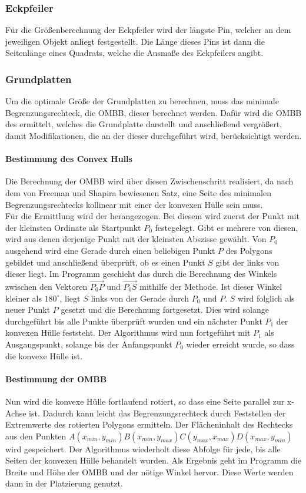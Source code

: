 \subsubsection{Eckpfeiler}
Für die Größenberechnung der Eckpfeiler wird der längste Pin, welcher an dem jeweiligen Objekt anliegt festgestellt.
Die Länge dieses Pins ist dann die Seitenlänge eines Quadrats, welche die Ausmaße des Eckpfeilers angibt.
\subsubsection{Grundplatten}
Um die optimale Größe der Grundplatten zu berechnen, muss das minimale Begrenzungsrechteck, die OMBB, dieser berechnet werden.
Dafür wird die OMBB des  ermittelt, welches die Grundplatte darstellt und anschließend vergrößert, damit Modifikationen, die an der dieser durchgeführt wird, berücksichtigt werden.
\paragraph{Bestimmung des Convex Hulls}
Die Berechnung der OMBB wird über diesen Zwischenschritt realisiert, da nach dem von Freeman und Shapira bewiesenen Satz, eine Seite des minimalen Begrenzungsrechtecks kollinear mit einer der konvexen Hülle sein muss. \\
Für die Ermittlung wird der  herangezogen.
Bei diesem wird zuerst der Punkt mit der kleinsten Ordinate als Startpunkt $P_0$ festegelegt.
Gibt es mehrere von diesen, wird aus denen derjenige Punkt mit der kleinsten Abszisse gewählt.
Von $P_0$ ausgehend wird eine Gerade durch einen beliebigen Punkt $P$ des Polygons gebildet und anschließend überprüft, ob es einen Punkt $S$ gibt der links von dieser liegt.
Im Programm geschieht das durch die Berechnung des Winkels zwischen den Vektoren $\overrightarrow{{P_0}P}$ und $\overrightarrow{{P_0}S}$ mithilfe der  Methode.
Ist dieser Winkel kleiner als $180^\circ$, liegt $S$ links von der Gerade durch $P_0$ und $P$.
$S$ wird folglich als neuer Punkt $P$ gesetzt und die Berechnung fortgesetzt.
Dies wird solange durchgeführt bis alle Punkte überprüft wurden und ein nächster Punkt $P_1$ der konvexen Hülle feststeht.
Der Algorithmus wird nun fortgeführt mit $P_1$ als Ausgangspunkt, solange bis der Anfangspunkt $P_0$ wieder erreicht wurde, so dass die konvexe Hülle  ist.
\paragraph{Bestimmung der OMBB}
Nun wird die konvexe Hülle fortlaufend rotiert, so dass eine Seite parallel zur x-Achse ist.
Dadurch kann leicht das Begrenzungsrechteck durch Feststellen der Extremwerte des rotierten Polygons ermitteln.
Der Flächeninhalt des Rechtecks aus den Punkten $A(x_{min}, y_{min}) B(x_{min}, y_{max}) C(y_{max}, x_{max}) D(x_{max}, y_{min})$ wird gespeichert.
Der Algorithmus wiederholt diese Abfolge für jede, bis alle Seiten der konvexen Hülle behandelt wurden.
Als Ergebnis geht im Programm die Breite und Höhe der OMBB und der nötige Winkel hervor.
Diese Werte werden dann in der Platzierung genutzt.
